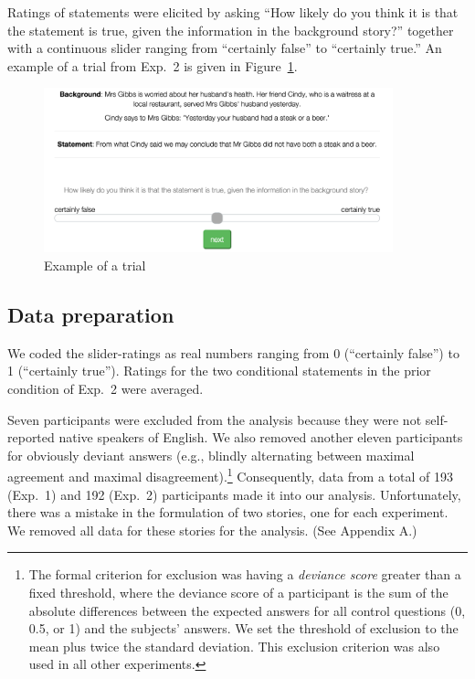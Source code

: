 \documentclass[12pt]{article}
\begin{document}
Ratings of statements were elicited by asking ``How likely do you think it is that the
statement is true, given the information in the background story?'' together with a continuous
slider ranging from ``certainly false'' to ``certainly true.'' An example of a trial from Exp.\ 2 is given
in Figure~\ref{fig:exampleShot}.

\begin{figure}
  \centering
  \includegraphics[width = 0.9\textwidth]{pics/expExampleShot.png}
  \caption{Example of a trial }
  \label{fig:exampleShot}
\end{figure}

\subsection{Data preparation} 

We coded the slider-ratings as real numbers ranging from 0
(``certainly false'') to 1 (``certainly true''). Ratings for the two conditional statements in the prior condition of Exp.\ 2 were averaged.

Seven participants were excluded from the analysis because they were not self-reported native speakers of English. We also removed another eleven participants for obviously deviant answers (e.g., blindly alternating between maximal agreement and maximal disagreement).\footnote{The
  formal criterion for exclusion was having a \emph{deviance score} greater than a fixed
  threshold, where the deviance score of a participant is the sum of the absolute differences
  between the expected answers for all control questions (0, 0.5, or 1) and the subjects'
  answers. %
  We set the threshold of exclusion to the mean plus twice the standard deviation. This
  exclusion criterion was also used in all other experiments.}  Consequently, data from a total
of 193 (Exp.\ 1) and 192 (Exp.\ 2) participants made it into our analysis. Unfortunately, there
was a mistake in the formulation of two stories, one for each experiment. We removed all data for these stories for the analysis. (See Appendix A.)
\end{document}
